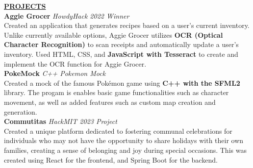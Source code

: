 \documentclass{article}
\begin{document}
%
%
\noindent \textbf{\underline{PROJECTS}} \\
\noindent \textbf{Aggie Grocer} \textit{HowdyHack 2022 Winner} \\
Created an application that generates recipes based on a user’s current inventory. Unlike currently available options, Aggie Grocer utilizes \textbf{OCR (Optical Character Recognition)} to scan receipts and automatically update a user’s inventory. Used HTML, CSS, and \textbf{JavaScript with Tesseract} to create and implement the OCR function for Aggie Grocer. \\

\noindent \textbf{PokeMock} \textit{C++ Pokemon Mock} \\
Created a mock of the famous Pok\'emon game using \textbf{C++ with the SFML2} library. The progam is enables basic game functionalities such as character movement, as well as added features such as custom map creation and generation. \\

\noindent \textbf{Commutitas} \textit{HackMIT 2023 Project} \\
Created a unique platform dedicated to fostering communal celebrations for individuals who may not have the opportunity to share holidays with their own families, creating a sense of belonging and joy during special occasions. This was created using React for the frontend, and Spring Boot for the backend. 
\end{document}
